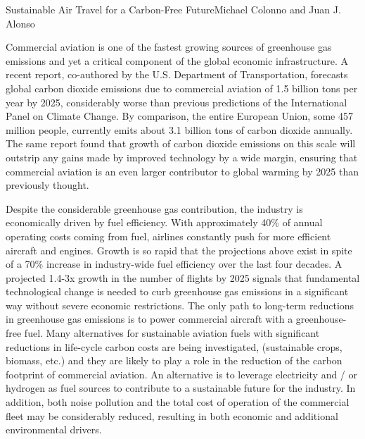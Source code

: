 \documentclass[10pt]{papertex}
\begin{document}
\makeatletter
\renewcommand{\papertex@headDateTime}{
    \raisebox{-5pt}
    {\fontsize{5mm}{6mm}\usefont{T1}{bch}{b}{n}{April 2014}}
    }
\makeatother

\begin{news}{2}{Sustainable Air Travel for a Carbon-Free Future}{Michael Colonno and Juan J. Alonso}{}{}

Commercial aviation is one of the fastest growing sources of greenhouse gas 
emissions and yet a critical component of the global economic infrastructure. 
A recent report, co-authored by the U.S. Department of Transportation, 
forecasts global carbon dioxide emissions due to commercial aviation of 1.5 
billion tons per year by 2025, considerably worse than previous predictions of 
the International Panel on Climate Change. By comparison, the entire European 
Union, some 457 million people, currently emits about 3.1 billion tons of 
carbon dioxide annually. The same report found that growth of carbon dioxide 
emissions on this scale will outstrip any gains made by improved technology 
by a wide margin, ensuring that commercial aviation is an even larger 
contributor to global warming by 2025 than previously thought.

Despite the considerable greenhouse gas contribution, the industry is 
economically driven by fuel efficiency. With approximately 40\% of annual 
operating costs coming from fuel, airlines constantly push for more efficient 
aircraft and engines. Growth is so rapid that the projections above exist in 
spite of a 70\% increase in industry-wide fuel efficiency over the last four 
decades. A projected 1.4-3x growth in the number of flights by 2025 signals 
that fundamental technological change is needed to curb greenhouse gas 
emissions in a significant way without severe economic restrictions. The only 
path to long-term reductions in greenhouse gas emissions is to power commercial 
aircraft with a greenhouse-free fuel. Many alternatives for sustainable 
aviation fuels with significant reductions in life-cycle carbon costs are 
being investigated, (sustainable crops, biomass, etc.) and they are likely to 
play a role in the reduction of the carbon footprint of commercial aviation. 
An alternative is to leverage electricity and / or hydrogen as fuel sources 
to contribute to a sustainable future for the industry. In addition, both 
noise pollution and the total cost of operation of the commercial fleet may 
be considerably reduced, resulting in both economic and additional 
environmental drivers.


\end{news}
\end{document}

